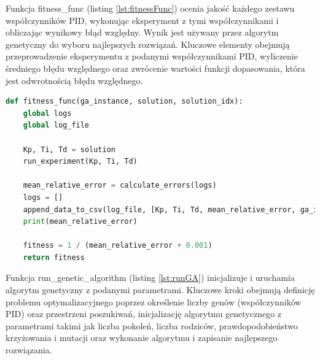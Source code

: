 \documentclass[12pt,twoside]{article}
\begin{document}
Funkcja fitness\_func (listing \ref{lst:fitnessFunc}) ocenia jakość każdego zestawu współczynników PID, wykonując eksperyment z tymi współczynnikami i obliczając wynikowy błąd względny. Wynik jest używany przez algorytm genetyczny do wyboru najlepszych rozwiązań. Kluczowe elementy obejmują przeprowadzenie eksperymentu z podanymi współczynnikami PID, wyliczenie średniego błędu względnego oraz zwrócenie wartości funkcji dopasowania, która jest odwrotnością błędu względnego.

\begin{lstlisting}[language=Python, caption=Funkcja dopasowania, label={lst:fitnessFunc}]
def fitness_func(ga_instance, solution, solution_idx):
    global logs
    global log_file

    Kp, Ti, Td = solution
    run_experiment(Kp, Ti, Td)

    mean_relative_error = calculate_errors(logs)
    logs = []
    append_data_to_csv(log_file, [Kp, Ti, Td, mean_relative_error, ga_instance.generations_completed])
    print(mean_relative_error)

    fitness = 1 / (mean_relative_error + 0.001)
    return fitness
\end{lstlisting}

Funkcja run\_genetic\_algorithm (listing \ref{lst:runGA}) inicjalizuje i uruchamia algorytm genetyczny z podanymi parametrami. Kluczowe kroki obejmują definicję problemu optymalizacyjnego poprzez określenie liczby genów (współczynników PID) oraz przestrzeni poszukiwań, inicjalizację algorytmu genetycznego z parametrami takimi jak liczba pokoleń, liczba rodziców, prawdopodobieństwo krzyżowania i mutacji oraz wykonanie algorytmu i zapisanie najlepszego rozwiązania.
\end{document}

